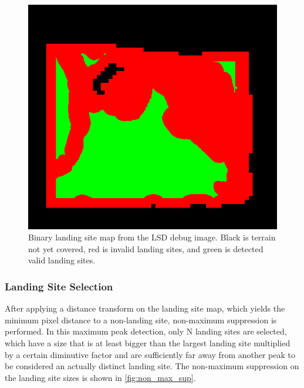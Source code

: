 \begin{figure}[ht!]
    \centering
    \includegraphics[scale=0.5]{images/system_overview/landing_map.png}
    \caption{Binary landing site map from the LSD debug image. Black is terrain not yet covered, red is invalid landing sites, and green is detected valid landing sites.}
    \label{fig:ls_map}
\end{figure}

\subsubsection{Landing Site Selection}\label{subsubsec:setup:ls_select}

After applying a distance transform on the landing site map, which yields the minimum pixel distance to a non-landing site, non-maximum suppression is performed. In this maximum peak detection, only N landing sites are selected, which have a size that is at least bigger than the largest landing site multiplied by a certain diminutive factor and are sufficiently far away from another peak to be considered an actually distinct landing site. The non-maximum suppression on the landing site sizes is shown in \cref{fig:non_max_sup}.

